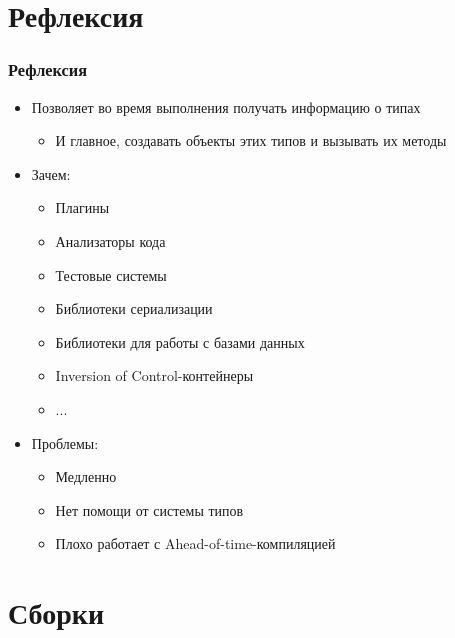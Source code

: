 \documentclass{../../slides-style}
\begin{document}
    \begin{frame}[plain]
        \titlepage
    \end{frame}

    \section{Рефлексия}

    \begin{frame}
        \frametitle{Рефлексия}
        \begin{itemize}
            \item Позволяет во время выполнения получать информацию о типах
            \begin{itemize}
                \item И главное, создавать объекты этих типов и вызывать их методы
            \end{itemize}
            \item Зачем:
            \begin{itemize}
                \item Плагины
                \item Анализаторы кода
                \item Тестовые системы
                \item Библиотеки сериализации
                \item Библиотеки для работы с базами данных
                \item Inversion of Control-контейнеры
                \item ...
            \end{itemize}
            \item Проблемы:
            \begin{itemize}
                \item Медленно
                \item Нет помощи от системы типов
                \item Плохо работает с Ahead-of-time-компиляцией
            \end{itemize}
        \end{itemize}
    \end{frame}

    \section{Сборки}
\end{document}
